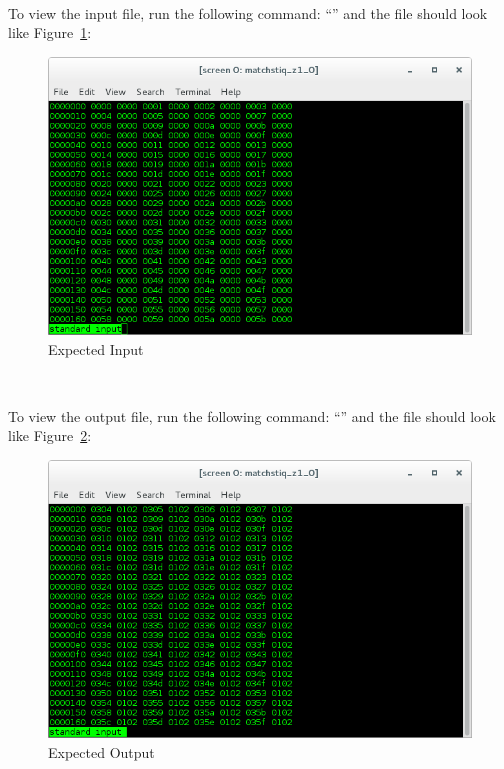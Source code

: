~\\
\begin{minipage}{\linewidth}
To view the input file, run the following command: ``'' and the file should look like Figure~\ref{fig:inBias2}: \\ \medskip
\begin{figure}[H]
	\centerline{\includegraphics[scale=0.5]{Matchstiq_Z1_bias_input}}
	\caption{Expected Input}
	\label{fig:inBias2}
\end{figure}
\end{minipage}
~\\

\begin{minipage}{\linewidth}
To view the output file, run the following command: ``'' and the file should look like Figure~\ref{fig:outBias2}: \\
\begin{figure}[H]
	\centerline{\includegraphics[scale=0.5]{Matchstiq_Z1_bias_output}}
	\caption{Expected Output}
	\label{fig:outBias2}
\end{figure}
\end{minipage}
~\\

